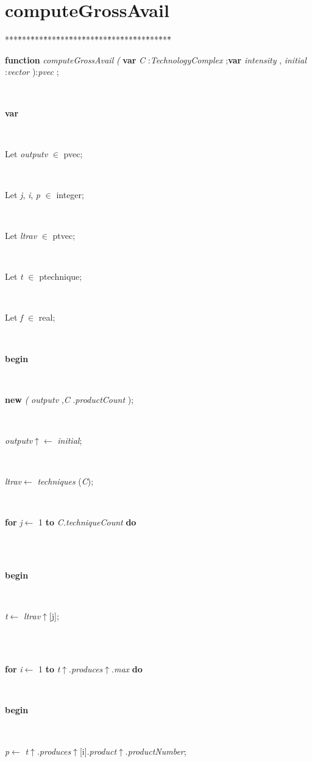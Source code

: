 \section{computeGrossAvail}\label{sec:harmonycomputeGrossAvail}

\begin{tabbing}
***\=***\=***\=***\=***\=***\=***\=***\=***\=***\=***\=***\=***\=\kill
\parbox{14cm}{\textsf{\textbf{function}  \textit{computeGrossAvail} \textit{(} \textbf{var}  \textit{C} :\textit{TechnologyComplex}  ;\textbf{var}     \textit{intensity} , \textit{initial} :\textit{vector} ):\textit{pvec} ;}}\\
\+\parbox{14cm}{\textsf{\textbf{var} }}\\
\parbox{14cm}{\textsf{Let \textit{outputv} $\in$ pvec;}}\\
\parbox{14cm}{\textsf{Let \textit{j}, \textit{i}, \textit{p} $\in$ integer;}}\\
\parbox{14cm}{\textsf{Let \textit{ltrav} $\in$ ptvec;}}\\
\parbox{14cm}{\textsf{Let \textit{t} $\in$ ptechnique;}}\\
\parbox{14cm}{\textsf{Let \textit{f} $\in$ real;}}\\
\-\<\+\parbox{14cm}{\textsf{\textbf{begin} }}\\
\parbox{14cm}{\textsf{\textbf{new} \textit{(}  \textit{outputv}  ,\textit{C} .\textit{productCount} );}}\\
\parbox{14cm}{\textsf{\textit{outputv}$\uparrow$\textit{}$\leftarrow$ \textit{initial}}; }\\
\parbox{14cm}{\textsf{\textit{ltrav}$\leftarrow$ \textit{techniques} (\textit{C})}; }\\
\+\parbox{14cm}{\textsf {\textbf {for } \textsf{\textit{j}$\leftarrow$ 1} \textbf{ to } \textsf{\textit{C.techniqueCount}} \textbf{ do } }}\\
\\
\<\parbox{14cm}{\textsf{\textbf{begin} }}\\
\parbox{14cm}{\textsf{\textit{t}$\leftarrow$ \textit{ltrav}$\uparrow$\textit{}[j]}; }\\
\\
\+\parbox{14cm}{\textsf {\textbf {for } \textsf{\textit{i}$\leftarrow$ 1} \textbf{ to } \textsf{\textit{t}$\uparrow$.\textit{produces}$\uparrow$.\textit{max}} \textbf{ do } }}\\
\<\parbox{14cm}{\textsf{\textbf{begin} }}\\
\parbox{14cm}{\textsf{\textit{p}$\leftarrow$ \textit{t}$\uparrow$.\textit{produces}$\uparrow$\textit{}[i].\textit{product}$\uparrow$.\textit{productNumber}}; }\\

\end{tabbing}
